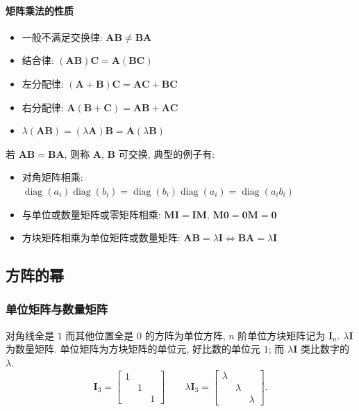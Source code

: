 \documentclass[UTF8]{ctexart}
\newcommand{\ve}[1]{\boldsymbol{\mathbf{#1}}}
\newcommand{\diag}{\operatorname{diag}}
\begin{document}
\begin{framed}
    \vspace{-0.7em}
    \paragraph{矩阵乘法的性质}
\begin{itemize}
    \item 一般不满足交换律: $ \ve A \ve B \neq \ve B \ve A $
    \item 结合律: $ (\ve A \ve B) \ve C = \ve A (\ve B \ve C) $
    \item 左分配律: $ (\ve A + \ve B) \ve C = \ve A \ve C + \ve B \ve C $
    \item 右分配律: $ \ve A (\ve B + \ve C) = \ve A \ve B + \ve A \ve C $
    \item $ \lambda(\ve A \ve B) = (\lambda \ve A) \ve B = \ve A (\lambda \ve B) $
\end{itemize}
\end{framed}

若 $ \ve{AB} = \ve{BA} $, 则称 $ \ve A $, $ \ve B $ 可交换, 典型的例子有:
\begin{itemize}
    \item 对角矩阵相乘: $ \diag(a_i) \diag(b_i) = \diag(b_i) \diag(a_i) = \diag(a_i b_i) $

    \item 与单位或数量矩阵或零矩阵相乘: $ \ve M \ve I = \ve I \ve M $, $ \ve M \ve 0 = \ve 0 \ve M = \ve 0 $

    \item 方块矩阵相乘为单位矩阵或数量矩阵: $ \ve A \ve B = \lambda \ve I \Leftrightarrow \ve B \ve A = \lambda \ve I $


\end{itemize}




\subsection{方阵的幂}
\subsubsection{单位矩阵与数量矩阵}
对角线全是 $ 1 $ 而其他位置全是 $ 0 $ 的方阵为单位方阵, $ n $ 阶单位方块矩阵记为 $ \ve I_n $. $ \lambda \ve I $ 为数量矩阵. 单位矩阵为方块矩阵的单位元, 好比数的单位元 $ 1 $; 而 $ \lambda \ve I $ 类比数字的 $ \lambda $.  
\[ 
\ve I_3 =
\begin{bmatrix}
  1 &  &  \\
   & 1 &  \\
   &  & 1
\end{bmatrix} \qquad
\lambda \ve I_3 =
\begin{bmatrix}
  \lambda &  &  \\
   & \lambda &  \\
   &  & \lambda
\end{bmatrix}
.\]
\end{document}
